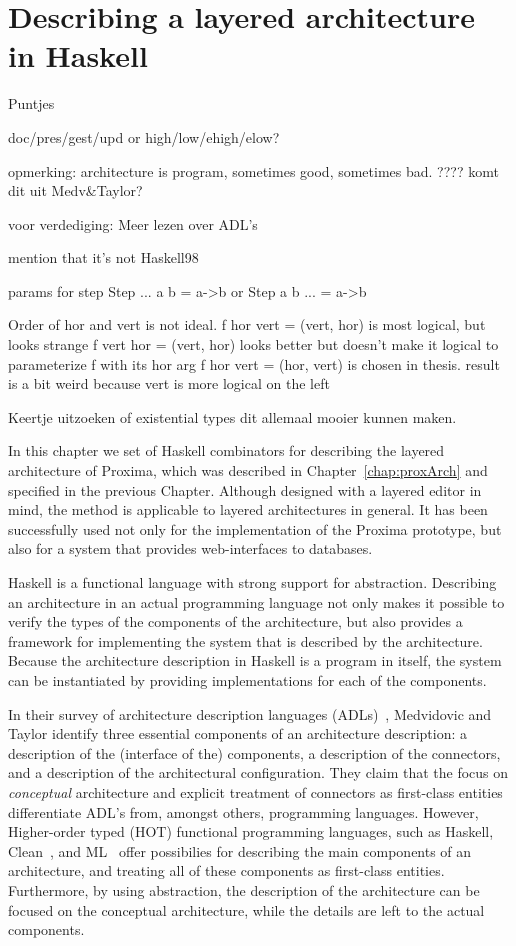 \chapter{Describing a layered architecture in Haskell} \label{chap:archCombs}

\bc
Puntjes

doc/pres/gest/upd or high/low/ehigh/elow?

opmerking: architecture is program, sometimes good, sometimes bad. ???? komt dit uit Medv&Taylor?

voor verdediging: Meer lezen over ADL's


mention that it's not Haskell98

params for step Step ... a b = a->b or Step a b ... = a->b


Order of hor and vert is not ideal.  
f hor vert = (vert, hor) is most logical, but looks strange
f vert hor = (vert, hor) looks better but doesn't make it logical to parameterize f with its hor arg
f hor vert = (hor, vert) is chosen in thesis. result is a bit weird because vert is more logical on the left


Keertje uitzoeken of existential types dit allemaal mooier kunnen maken.
\ec



In this chapter we set of Haskell combinators for describing the layered architecture of Proxima, which was described in Chapter~\ref{chap:proxArch} and specified in the previous Chapter. Although designed with a layered editor in mind, the method is applicable to layered architectures in general. It has been successfully used not only for the implementation of the Proxima prototype, but also for a system that provides web-interfaces to databases. 

Haskell is a functional language with strong support for abstraction. Describing an architecture in an actual programming language not only makes it possible to verify the types of the components of the architecture, but also provides a framework for implementing the system that is described by the architecture. Because the architecture description in Haskell is a program in itself, the system can be instantiated by providing implementations for each of the components.

In their survey of architecture description languages (ADLs)~\cite{medvidovic00ADLs}, Medvidovic and Taylor identify three essential components of an architecture description: a description of the (interface of the) components, a description of the connectors, and a description of the architectural configuration. They claim that the focus on {\em conceptual} architecture and explicit treatment of connectors as first-class entities differentiate ADL's from, amongst others, programming languages. However, Higher-order typed (HOT) functional programming languages, such as Haskell, Clean~\cite{plasmeijer01clean}, and ML~\cite{milner97ML} offer possibilies for describing the main components of an architecture, and treating all of these components as first-class entities. Furthermore, by using abstraction, the description of the architecture can be focused on the conceptual architecture, while the details are left to the actual components.


